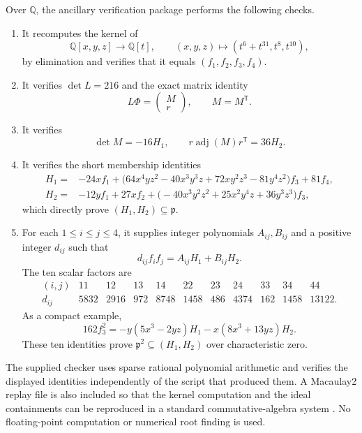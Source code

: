 \documentclass[11pt]{amsart}
\theoremstyle{remark}
\DeclareMathOperator{\adj}{adj}
\begin{document}
Over $\mathbb Q$, the ancillary verification package performs the following checks.
\begin{enumerate}
\renewcommand{\labelenumi}{(\roman{enumi})}
\item It recomputes the kernel of
\[
 \mathbb Q[x,y,z]\longrightarrow\mathbb Q[t],\qquad
 (x,y,z)\longmapsto(t^6+t^{31},t^8,t^{10}),
\]
by elimination and verifies that it equals $(f_1,f_2,f_3,f_4)$.
\item It verifies $\det L=216$ and the exact matrix identity
\[
 L\Phi=\begin{pmatrix}M\\r\end{pmatrix},\qquad M=M^{\mathsf T}.
\]
\item It verifies
\[
 \det M=-16H_1,
 \qquad
 r\adj(M)r^{\mathsf T}=36H_2.
\]
\item It verifies the short membership identities
\begin{align*}
H_1={}&-24x f_1+\bigl(64x^4yz^2-40x^3y^3z+72xy^2z^3-81y^4z^2\bigr)f_3+81f_4,\\
H_2={}&-12y f_1+27x f_2+\bigl(-40x^3y^2z^2+25x^2y^4z+36y^3z^3\bigr)f_3,
\end{align*}
which directly prove $(H_1,H_2)\subseteq\mathfrak p$.
\item For each $1\le i\le j\le4$, it supplies integer polynomials $A_{ij},B_{ij}$ and a positive integer $d_{ij}$ such that
\[
 d_{ij}f_if_j=A_{ij}H_1+B_{ij}H_2.
\]
The ten scalar factors are
\[
\begin{array}{c|cccccccccc}
(i,j)&11&12&13&14&22&23&24&33&34&44\\ \hline
d_{ij}&5832&2916&972&8748&1458&486&4374&162&1458&13122.
\end{array}
\]
As a compact example,
\[
 162f_3^2=-y(5x^3-2yz)H_1-x(8x^3+13yz)H_2.
\]
These ten identities prove $\mathfrak p^2\subseteq(H_1,H_2)$ over characteristic zero.
\end{enumerate}

The supplied checker uses sparse rational polynomial arithmetic and verifies the displayed identities independently of the script that produced them.  A Macaulay2 replay file is also included so that the kernel computation and the ideal containments can be reproduced in a standard commutative-algebra system \cite{Macaulay2}.  No floating-point computation or numerical root finding is used.

\appendix
\end{document}
